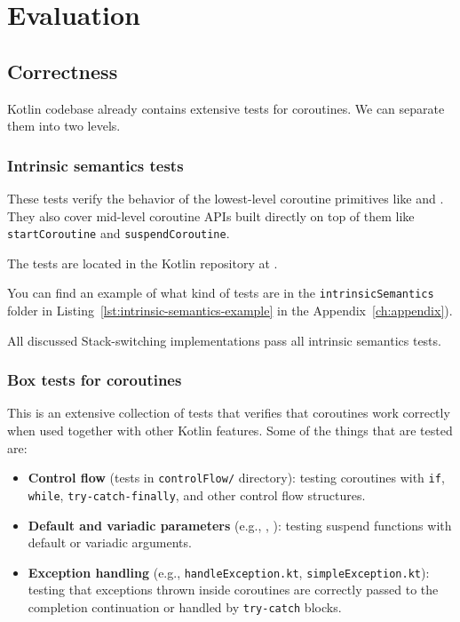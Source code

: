 \chapter{Evaluation}
\label{ch:evaluation}

\section{Correctness}
\label{sec:testing}

Kotlin codebase already contains extensive tests for coroutines. We can separate them into
two levels.

\subsection*{Intrinsic semantics tests}

These tests verify the behavior of the lowest-level coroutine
primitives like \startCoroutineUninterceptedOrReturn and \suspendCoroutineUninterceptedOrReturn.
They also cover mid-level coroutine APIs built directly on top of them like \texttt{startCoroutine}
and \texttt{suspendCoroutine}.

The tests are located in the Kotlin repository at
.

You can find an example of what kind of tests are in the \texttt{intrinsicSemantics} folder in Listing~\ref{lst:intrinsic-semantics-example} in the Appendix~\ref{ch:appendix}).

All discussed Stack-switching implementations pass all intrinsic semantics tests.

\subsection*{Box tests for coroutines}

This is an extensive collection of tests that verifies that coroutines work correctly when used
together with other Kotlin features.
Some of the things that are tested are:
\begin{itemize}
    \item \textbf{Control flow} (tests in \texttt{controlFlow/} directory): testing coroutines
    with \texttt{if}, \texttt{while}, \texttt{try-catch-finally}, and other control flow structures.
    \item \textbf{Default and variadic parameters} (e.g., ,
    ): testing suspend functions with default or variadic arguments.
    \item \textbf{Exception handling} (e.g., \texttt{handleException.kt}, \texttt{simpleException.kt}): testing
    that exceptions thrown inside coroutines are correctly passed to the completion continuation or
    handled by \texttt{try-catch} blocks.
\end{itemize}

